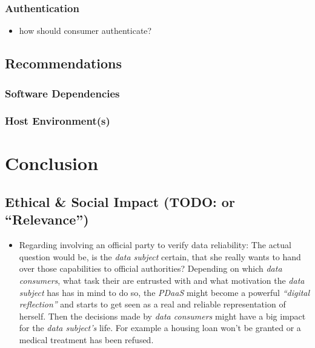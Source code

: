 \documentclass[12pt,english,a4paper,titlepage,cleardoublepage=empty,dottedtoc]{report}
\providecommand{\tightlist}{%
  \setlength{\itemsep}{0pt}\setlength{\parskip}{0pt}}
\begin{document}
\subsection{Authentication}\label{authentication-2}

\begin{itemize}
\tightlist
\item
  how should consumer authenticate?
\end{itemize}

\section{Recommendations}\label{recommendations}

\subsection{Software Dependencies}\label{software-dependencies}

\subsection{Host Environment(s)}\label{host-environments}

\chapter{Conclusion}\label{conclusion}

\section{\texorpdfstring{Ethical \& Social Impact (TODO: or
``Relevance'')}{Ethical \& Social Impact (TODO: or Relevance)}}\label{ethical-social-impact-todo-or-relevance}

\begin{itemize}
\tightlist
\item
  Regarding involving an official party to verify data reliability: The
  actual question would be, is the \emph{data subject} certain, that she
  really wants to hand over those capabilities to official authorities?
  Depending on which \emph{data consumers}, what task their are
  entrusted with and what motivation the \emph{data subject} has has in
  mind to do so, the \emph{PDaaS} might become a powerful
  \emph{``digital reflection''} and starts to get seen as a real and
  reliable representation of herself. Then the decisions made by
  \emph{data consumers} might have a big impact for the \emph{data
  subject's} life. For example a housing loan won't be granted or a
  medical treatment has been refused.
\end{itemize}
\end{document}
